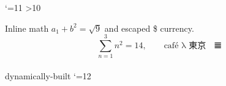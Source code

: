 \catcode`\@=11
\def\greet#1{Hello, #1!}
\newcount\visits
{}
\newdimen\measure
\measure=6.5pt
\ifnum\visits>10
\else
\fi
\iffalse
  ignored {material
    with {nested} groups}
  \ifodd\visits
    ignored conditional branch
  \fi
\fi
Inline math $a_1+b^2=\sqrt{9}$ and escaped \$ currency.
$$
  \sum_{n=1}^{3} n^2 = 14,\qquad
  \text{café λ 東京 🚀 𝌆}
$$
\def\pick{\@ifnextchar[\pickopt\pickplain}
\pick[optional] \\ %
\csname dynamically-built\endcsname
\catcode`\@=12
